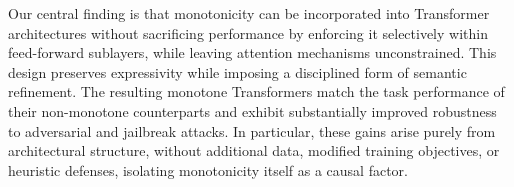 \documentclass{article}
\theoremstyle{plain}
\theoremstyle{definition}
\theoremstyle{remark}
\begin{document}


Our central finding is that monotonicity can be incorporated into Transformer architectures without sacrificing performance by enforcing it selectively within feed-forward sublayers, while leaving attention mechanisms unconstrained. This design preserves expressivity while imposing a disciplined form of semantic refinement. The resulting monotone Transformers match the task performance of their non-monotone counterparts and exhibit substantially improved robustness to adversarial and jailbreak attacks. 
In particular, these gains arise purely from architectural structure, without additional data, modified training objectives, or heuristic defenses, isolating monotonicity itself as a causal factor.

\end{document}
